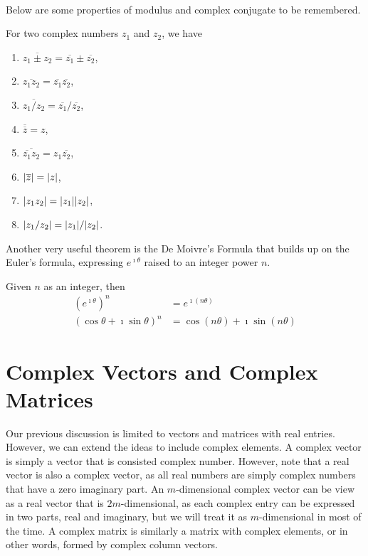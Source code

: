\\
Below are some properties of modulus and complex conjugate to be remembered.
\begin{proper}
\label{complexnum}
For two complex numbers $z_1$ and $z_2$, we have
\begin{enumerate}[label=(\alph*)]
\item $\overline{z_1 \pm z_2} = \overline{z_1} \pm \overline{z_2}$, 
\item $\overline{z_1z_2} = \overline{z_1}\overline{z_2}$,
\item $\overline{z_1/z_2} = \overline{z_1}/\overline{z_2}$,
\item $\overline{\overline{z}} = z$,
\item $\overline{\overline{z_1}z_2} = z_1\overline{z_2}$,
\item $\abs{\overline{z}} = \abs{z}$,
\item $\abs{z_1z_2} = \abs{z_1}\abs{z_2}$,
\item $\abs{z_1/z_2} = \abs{z_1}/\abs{z_2}$.
\end{enumerate}
\end{proper}
Another very useful theorem is the De Moivre's Formula that builds up on the Euler's formula, expressing $e^{\imath \theta}$ raised to an integer power $n$.
\begin{thm}
Given $n$ as an integer, then
\begin{align*}
(e^{\imath \theta})^n &= e^{\imath (n\theta)} \\
(\cos\theta + \imath \sin\theta)^n &= \cos(n\theta) + \imath \sin(n\theta)
\end{align*}
\end{thm}

\section{Complex Vectors and Complex Matrices}

Our previous discussion is limited to vectors and matrices with real entries. However, we can extend the ideas to include complex elements. A complex vector is simply a vector that is consisted complex number. However, note that a real vector is also a complex vector, as all real numbers are simply complex numbers that have a zero imaginary part. An $m$-dimensional complex vector can be view as a real vector that is $2m$-dimensional, as each complex entry can be expressed in two parts, real and imaginary, but we will treat it as $m$-dimensional in most of the time. A complex matrix is similarly a matrix with complex elements, or in other words, formed by complex column vectors.

